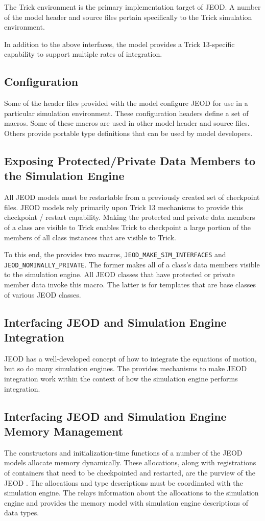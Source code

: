 The Trick environment is the primary implementation target of JEOD.
A number of the model header and source files pertain specifically to the Trick
simulation environment.

In addition to the above interfaces, the model provides a
Trick 13-specific capability to support multiple rates of integration.

\subsection{Configuration}
Some of the header files provided with the model configure JEOD for use in
a particular simulation environment. These configuration headers define
a set of \Cplusplus macros. Some of these macros are used in other model
header and source files. Others provide portable type definitions that can
be used by  model developers.

\subsection{Exposing Protected/Private Data Members to the Simulation Engine}
All JEOD models must be restartable from a previously created set of
checkpoint files. JEOD models rely primarily upon Trick 13 mechanisms to provide
this checkpoint / restart capability. Making the protected and private data
members of a class are visible to Trick enables Trick to checkpoint a large
portion of the members of all class instances that are visible to Trick.

To this end, the \ModelDesc provides two macros,
\verb|JEOD_MAKE_SIM_INTERFACES| and \verb|JEOD_NOMINALLY_PRIVATE|.
The former makes all of a class's data members visible
to the simulation engine.
All JEOD classes that have protected or private member data invoke this macro.
The latter is for templates that are base classes of various JEOD classes.

\subsection{Interfacing JEOD and Simulation Engine Integration}
JEOD has a well-developed concept of how to integrate the equations of motion,
but so do many simulation engines. The \ModelDesc provides mechanisms to
make JEOD integration work within the context of how the simulation engine
performs integration.

\subsection{Interfacing JEOD and Simulation Engine Memory Management}
The constructors and initialization-time functions of a number of the JEOD
models allocate memory dynamically. These allocations, along with registrations
of containers that need to be checkpointed and restarted, are the purview
of the JEOD \MEMORY. The allocations and type descriptions must be coordinated
with the simulation engine. The \ModelDesc relays information about the
allocations to the simulation engine and provides the memory model with
simulation engine descriptions of data types.

